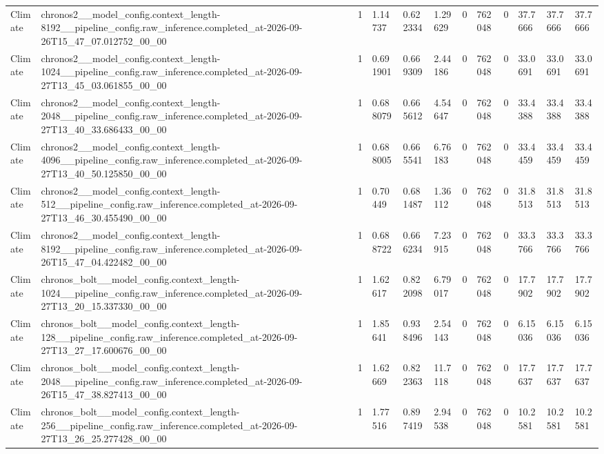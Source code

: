 \begin{tabular}{llllllllllll}
Climate & chronos2\_\_model\_config.context\_length-8192\_\_pipeline\_config.raw\_inference.completed\_at-2026-09-26T15\_47\_07.012752\_00\_00 & 1 & 1.14737 & 0.622334 & 1.29629 & 0 & 762048 & 0 & 37.7666 & 37.7666 & 37.7666 \\
Climate & chronos2\_\_model\_config.context\_length-1024\_\_pipeline\_config.raw\_inference.completed\_at-2026-09-27T13\_45\_03.061855\_00\_00 & 1 & 0.691901 & 0.669309 & 2.44186 & 0 & 762048 & 0 & 33.0691 & 33.0691 & 33.0691 \\
Climate & chronos2\_\_model\_config.context\_length-2048\_\_pipeline\_config.raw\_inference.completed\_at-2026-09-27T13\_40\_33.686433\_00\_00 & 1 & 0.688079 & 0.665612 & 4.54647 & 0 & 762048 & 0 & 33.4388 & 33.4388 & 33.4388 \\
Climate & chronos2\_\_model\_config.context\_length-4096\_\_pipeline\_config.raw\_inference.completed\_at-2026-09-27T13\_40\_50.125850\_00\_00 & 1 & 0.688005 & 0.665541 & 6.76183 & 0 & 762048 & 0 & 33.4459 & 33.4459 & 33.4459 \\
Climate & chronos2\_\_model\_config.context\_length-512\_\_pipeline\_config.raw\_inference.completed\_at-2026-09-27T13\_46\_30.455490\_00\_00 & 1 & 0.70449 & 0.681487 & 1.36112 & 0 & 762048 & 0 & 31.8513 & 31.8513 & 31.8513 \\
Climate & chronos2\_\_model\_config.context\_length-8192\_\_pipeline\_config.raw\_inference.completed\_at-2026-09-26T15\_47\_04.422482\_00\_00 & 1 & 0.688722 & 0.666234 & 7.23915 & 0 & 762048 & 0 & 33.3766 & 33.3766 & 33.3766 \\
Climate & chronos\_bolt\_\_model\_config.context\_length-1024\_\_pipeline\_config.raw\_inference.completed\_at-2026-09-27T13\_20\_15.337330\_00\_00 & 1 & 1.62617 & 0.822098 & 6.79017 & 0 & 762048 & 0 & 17.7902 & 17.7902 & 17.7902 \\
Climate & chronos\_bolt\_\_model\_config.context\_length-128\_\_pipeline\_config.raw\_inference.completed\_at-2026-09-27T13\_27\_17.600676\_00\_00 & 1 & 1.85641 & 0.938496 & 2.54143 & 0 & 762048 & 0 & 6.15036 & 6.15036 & 6.15036 \\
Climate & chronos\_bolt\_\_model\_config.context\_length-2048\_\_pipeline\_config.raw\_inference.completed\_at-2026-09-26T15\_47\_38.827413\_00\_00 & 1 & 1.62669 & 0.822363 & 11.7118 & 0 & 762048 & 0 & 17.7637 & 17.7637 & 17.7637 \\
Climate & chronos\_bolt\_\_model\_config.context\_length-256\_\_pipeline\_config.raw\_inference.completed\_at-2026-09-27T13\_26\_25.277428\_00\_00 & 1 & 1.77516 & 0.897419 & 2.94538 & 0 & 762048 & 0 & 10.2581 & 10.2581 & 10.2581 \\

\end{tabular}
